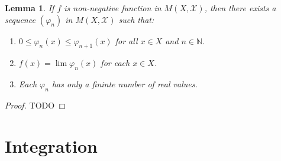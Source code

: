 \documentclass[10pt]{article}
\newtheorem{lemma}{Lemma}
\newcommand{\mcal}[1]{\mathcal{#1}}
\begin{document}
\begin{itemize}
  \begin{lemma} \label{lemma:approximation-by-simple-functions}
    If $f$ is non-negative function in $M(X,\mcal{X})$, then there exists a sequence $(\varphi_n)$ in $M(X, \mcal{X})$ such that:
    \begin{enumerate}
      \item[(a)] $0 \leq \varphi_n(x) \leq \varphi_{n+1}(x)$ for all $x \in X$ and $n \in \mathbb{N}$.
      \item[(b)] $f(x) = \lim \varphi_n(x)$ for each $x \in X$.
      \item[(c)] Each $\varphi_n$ has only a fininte number of real values.
    \end{enumerate}
  \end{lemma}

  \begin{proof}
    TODO
  \end{proof}
\end{itemize}

\section{Integration}
\end{document}
